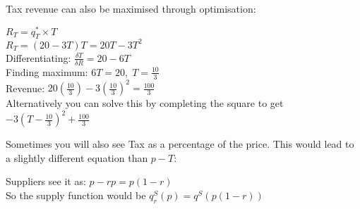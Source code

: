 \documentclass[12pt, letterpaper]{article}
\begin{document}
Tax revenue can also be maximised through optimisation:
\begin{center}
	$R_T = q^*_T\times T$\\
	$R_T = (20-3T)T = 20T-3T^2$\\
	Differentiating: $\frac{\delta T}{\delta R} = 20 - 6T$\\
	Finding maximum: $6T = 20,\; T = \frac{10}{3}$\\
	Revenue: $20(\frac{10}{3}) - 3(\frac{10}{3})^2 = \frac{100}{3}$\\
	Alternatively you can solve this by completing the square to get $-3(T-\frac{10}{3})^2 + \frac{100}{3}$
\end{center}
Sometimes you will also see Tax as a percentage of the price. This would lead to a slightly different equation than $p-T$:
\begin{center}
	Suppliers see it as: $p-rp=p(1-r)$\\
	So the supply function would be $q^S_r(p)=q^S(p(1-r))$
\end{center}
\end{document}
